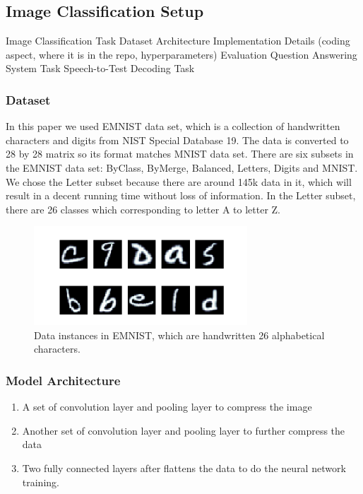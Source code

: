 \subsection{Image Classification Setup}

Image Classification Task
    Dataset
    Architecture
    Implementation Details (coding aspect, where it is in the repo, hyperparameters)
    Evaluation
Question Answering System Task
Speech-to-Test Decoding Task




\subsubsection{Dataset}

In this paper we used EMNIST \cite{emnist} data set, which is a collection of handwritten characters and digits from NIST Special Database 19. The data is converted to 28 by 28 matrix so its format matches MNIST data set. There are six subsets in the EMNIST data set: ByClass, ByMerge, Balanced, Letters, Digits and MNIST. We chose the Letter subset because there are around 145k data in it, which will result in a decent running time without loss of information. In the Letter subset, there are 26 classes which corresponding to letter A to letter Z.
\begin{figure}[htp]
    \centering
    \includegraphics[width=8cm]{img/EMNIST.png}
    \caption{Data instances in EMNIST, which are handwritten 26 alphabetical characters.}
    \label{fig:EMNIST}
\end{figure}


\subsubsection{Model Architecture}
\begin{enumerate}[start=1,label={\bfseries\arabic*:}]
    \item A set of convolution layer and pooling layer to compress the image
    \item Another set of convolution layer and pooling layer to further compress the data
    \item Two fully connected layers after flattens the data to do the neural network training.
    \end{enumerate}

